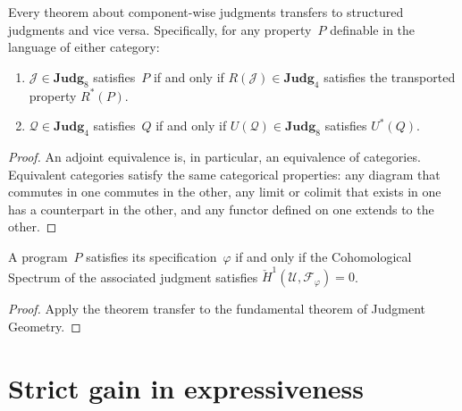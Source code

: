 \begin{corollary}
\label{cor:theorem-transfer}
Every theorem about component-wise judgments transfers to structured
judgments and vice versa.  Specifically, for any property~$P$ definable
in the language of either category:
\begin{enumerate}[label=(\alph*),nosep]
\item $\mathcal{J} \in \mathbf{Judg}_8$ satisfies~$P$ if and only if
  $R(\mathcal{J}) \in \mathbf{Judg}_4$ satisfies the transported
  property $R^*(P)$.
\item $\mathcal{Q} \in \mathbf{Judg}_4$ satisfies~$Q$ if and only if
  $U(\mathcal{Q}) \in \mathbf{Judg}_8$ satisfies $U^*(Q)$.
\end{enumerate}
\end{corollary}

\begin{proof}
An adjoint equivalence is, in particular, an equivalence of categories.
Equivalent categories satisfy the same categorical properties: any
diagram that commutes in one commutes in the other, any limit or
colimit that exists in one has a counterpart in the other, and any
functor defined on one extends to the other.
\end{proof}

\begin{corollary}
\label{cor:fundamental}
A program~$P$ satisfies its specification~$\varphi$ if and only if
the Cohomological Spectrum of the associated judgment satisfies
$\check{H}^1(\mathcal{U}, \mathcal{F}_\varphi) = 0$.
\end{corollary}

\begin{proof}
Apply the theorem transfer to the fundamental theorem of
Judgment Geometry.
\end{proof}

\section{Strict gain in expressiveness}
\label{sec:strict-gain}

